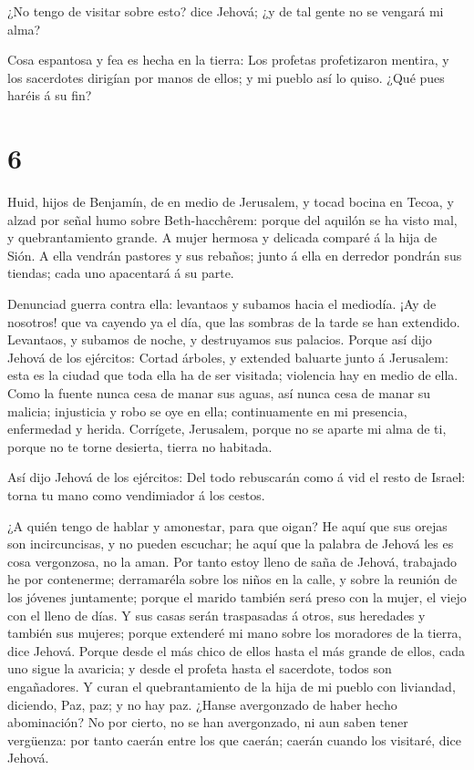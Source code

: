  ¿No tengo de visitar sobre esto? dice Jehová; ¿y de tal
gente no se vengará mi alma?

 Cosa espantosa y fea es hecha en la tierra: 
Los profetas profetizaron mentira, y los sacerdotes dirigían por manos
de ellos; y mi pueblo así lo quiso. ¿Qué pues haréis á su fin?

\hypertarget{section-5}{%
\section{6}\label{section-5}}

 Huid, hijos de Benjamín, de en medio de Jerusalem, y tocad
bocina en Tecoa, y alzad por señal humo sobre Beth-hacchêrem: porque del
aquilón se ha visto mal, y quebrantamiento grande.  A mujer
hermosa y delicada comparé á la hija de Sión.  A ella
vendrán pastores y sus rebaños; junto á ella en derredor pondrán sus
tiendas; cada uno apacentará á su parte.

 Denunciad guerra contra ella: levantaos y subamos hacia el
mediodía. ¡Ay de nosotros! que va cayendo ya el día, que las sombras de
la tarde se han extendido.  Levantaos, y subamos de noche, y
destruyamos sus palacios.  Porque así dijo Jehová de los
ejércitos: Cortad árboles, y extended baluarte junto á Jerusalem: esta
es la ciudad que toda ella ha de ser visitada; violencia hay en medio de
ella.  Como la fuente nunca cesa de manar sus aguas, así
nunca cesa de manar su malicia; injusticia y robo se oye en ella;
continuamente en mi presencia, enfermedad y herida. 
Corrígete, Jerusalem, porque no se aparte mi alma de ti, porque no te
torne desierta, tierra no habitada.

 Así dijo Jehová de los ejércitos: Del todo rebuscarán como
á vid el resto de Israel: torna tu mano como vendimiador á los cestos.

 ¿A quién tengo de hablar y amonestar, para que oigan? He
aquí que sus orejas son incircuncisas, y no pueden escuchar; he aquí que
la palabra de Jehová les es cosa vergonzosa, no la aman. 
Por tanto estoy lleno de saña de Jehová, trabajado he por contenerme;
derramaréla sobre los niños en la calle, y sobre la reunión de los
jóvenes juntamente; porque el marido también será preso con la mujer, el
viejo con el lleno de días.  Y sus casas serán traspasadas
á otros, sus heredades y también sus mujeres; porque extenderé mi mano
sobre los moradores de la tierra, dice Jehová.  Porque
desde el más chico de ellos hasta el más grande de ellos, cada uno sigue
la avaricia; y desde el profeta hasta el sacerdote, todos son
engañadores.  Y curan el quebrantamiento de la hija de mi
pueblo con liviandad, diciendo, Paz, paz; y no hay paz. 
¿Hanse avergonzado de haber hecho abominación? No por cierto, no se han
avergonzado, ni aun saben tener vergüenza: por tanto caerán entre los
que caerán; caerán cuando los visitaré, dice Jehová.

